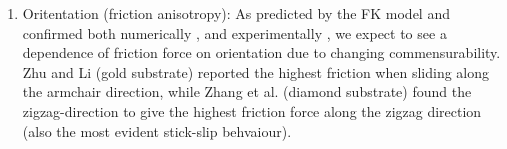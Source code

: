\begin{enumerate}

  \item Oritentation (friction anisotropy): As predicted by the FK model and confirmed both numerically \cite{zhu_study_2018}, \cite{ma12091425} and experimentally \cite{DIENWIEBEL2005197}, \cite{feng_superlubric_2013} we expect to see a dependence of friction force on orientation due to changing commensurability. Zhu and Li \cite{zhu_study_2018} (gold substrate) reported the highest friction when sliding along the armchair direction, while Zhang et al. \cite{ma12091425} (diamond substrate) found the zigzag-direction to give the highest friction force along the zigzag direction (also the most evident stick-slip behvaiour). 
\end{enumerate}
  






